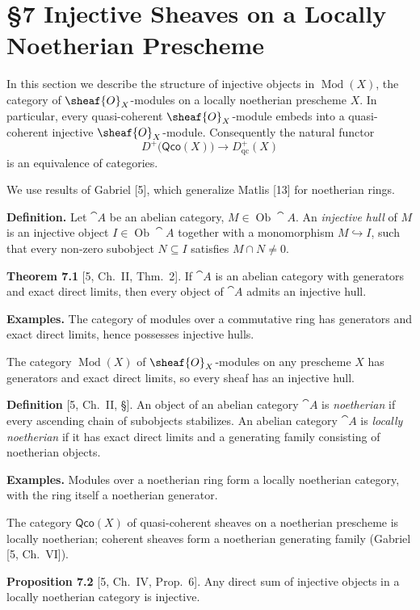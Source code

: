 \setcounter{page}{120}
\section{\S7 Injective Sheaves on a Locally Noetherian Prescheme}

In this section we describe the structure of injective objects in $\operatorname{Mod}(X)$, the category of $\sheaf{O}_X$-modules on a locally noetherian prescheme $X$. In particular, every quasi-coherent $\sheaf{O}_X$-module embeds into a quasi-coherent injective $\sheaf{O}_X$-module. Consequently the natural functor
\[
D^+\big(\mathsf{Qco}(X)\big) \to D^+_{\mathrm{qc}}(X)
\]
is an equivalence of categories.

We use results of Gabriel [5], which generalize Matlis [13] for noetherian rings.

\textbf{Definition.}
Let $\cat{A}$ be an abelian category, $M\in\operatorname{Ob}\cat{A}$. An \textit{injective hull} of $M$ is an injective object $I\in\operatorname{Ob}\cat{A}$ together with a monomorphism $M\hookrightarrow I$, such that every non-zero subobject $N\subseteq I$ satisfies $M\cap N\neq 0$.

\textbf{Theorem 7.1} [5, Ch.\ II, Thm.\ 2].
If $\cat{A}$ is an abelian category with generators and exact direct limits, then every object of $\cat{A}$ admits an injective hull.

\textbf{Examples.}
The category of modules over a commutative ring has generators and exact direct limits, hence possesses injective hulls.

\setcounter{page}{121}
The category $\operatorname{Mod}(X)$ of $\sheaf{O}_X$-modules on any prescheme $X$ has generators and exact direct limits, so every sheaf has an injective hull.

\textbf{Definition} [5, Ch.\ II, \S].
An object of an abelian category $\cat{A}$ is \textit{noetherian} if every ascending chain of subobjects stabilizes.
An abelian category $\cat{A}$ is \textit{locally noetherian} if it has exact direct limits and a generating family consisting of noetherian objects.

\textbf{Examples.}
Modules over a noetherian ring form a locally noetherian category, with the ring itself a noetherian generator.

The category $\mathsf{Qco}(X)$ of quasi-coherent sheaves on a noetherian prescheme is locally noetherian; coherent sheaves form a noetherian generating family (Gabriel [5, Ch.\ VI]).

\textbf{Proposition 7.2} [5, Ch.\ IV, Prop.\ 6].
Any direct sum of injective objects in a locally noetherian category is injective.

